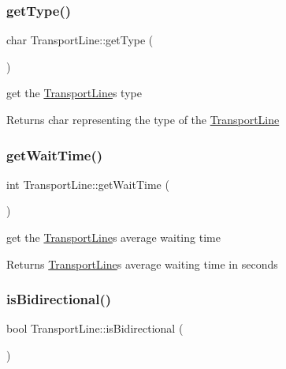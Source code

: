 \subsubsection{\texorpdfstring{get\+Type()}{getType()}}
{\footnotesize\ttfamily char Transport\+Line\+::get\+Type (\begin{DoxyParamCaption}{ }\end{DoxyParamCaption})}



get the \hyperlink{class_transport_line}{Transport\+Line}\textquotesingle{}s type 

\begin{DoxyReturn}{Returns}
char representing the type of the \hyperlink{class_transport_line}{Transport\+Line} 
\end{DoxyReturn}
\mbox{\label{class_transport_line_a789befa0e492bd2e8e7afe0b58f995b2}} 
\subsubsection{\texorpdfstring{get\+Wait\+Time()}{getWaitTime()}}
{\footnotesize\ttfamily int Transport\+Line\+::get\+Wait\+Time (\begin{DoxyParamCaption}{ }\end{DoxyParamCaption})}



get the \hyperlink{class_transport_line}{Transport\+Line}\textquotesingle{}s average waiting time 

\begin{DoxyReturn}{Returns}
\hyperlink{class_transport_line}{Transport\+Line}\textquotesingle{}s average waiting time in seconds 
\end{DoxyReturn}
\mbox{\label{class_transport_line_a5f521dfc4032d05538b16ce32c04d67c}} 
\subsubsection{\texorpdfstring{is\+Bidirectional()}{isBidirectional()}}
{\footnotesize\ttfamily bool Transport\+Line\+::is\+Bidirectional (\begin{DoxyParamCaption}{ }\end{DoxyParamCaption})}



